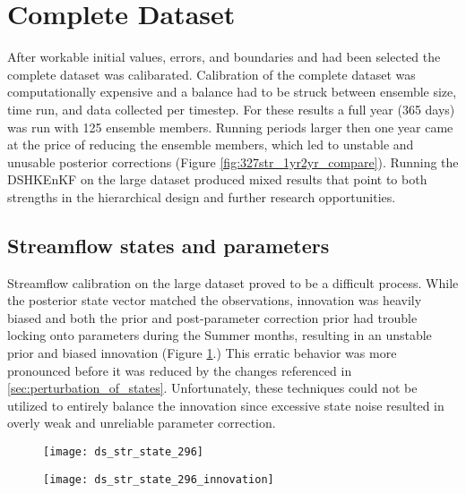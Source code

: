 \section{Complete Dataset}

After workable initial values, errors, and boundaries and had been selected the complete dataset was calibarated. Calibration of the complete dataset was computationally expensive and a balance had to be struck between ensemble size, time run, and data collected per timestep. For these results a full year (365 days) was run with 125 ensemble members. Running periods larger then one year came at the price of reducing the ensemble members, which led to unstable and unusable posterior corrections (Figure \ref{fig:327str_1yr2yr_compare}). Running the DSHKEnKF on the large dataset produced mixed results that point to both strengths in the hierarchical design and further research opportunities.

\subsection{Streamflow states and parameters}

Streamflow calibration on the large dataset proved to be a difficult process. While the posterior state vector matched the observations, innovation was heavily biased and both the prior and post-parameter correction prior had trouble locking onto parameters during the Summer months, resulting in an unstable prior and biased innovation (Figure \ref{fig:str_state_296}.) This erratic behavior was more pronounced before it was reduced by the changes referenced in \autoref{sec:perturbation_of_states}. Unfortunately, these techniques could not be utilized to entirely balance the innovation since excessive state noise resulted in overly weak and unreliable parameter correction.


\begin{figure}
\centering
\begin{minipage}{.48\textwidth}
  \centering
  \texttt{[image: ds\_str\_state\_296]}
  \label{fig:296str}
\end{minipage}%
\begin{minipage}{.48\textwidth}
  \centering
  \texttt{[image: ds\_str\_state\_296\_innovation]}
  \label{fig:296strinnovation}
\end{minipage}
\label{fig:str_state_296}
\end{figure}



